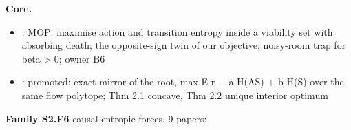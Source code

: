 \documentclass[10pt]{article}
\newcommand{\memb}[1]{\par\smallskip\textbf{#1}\quad}
\begin{document}
\memb{Core.}
\begin{itemize}[nosep,leftmargin=1.2em]
\item \citet{Ramirez-Ruiz-complex22}: MOP: maximise action and transition entropy inside a viability set with absorbing death; the opposite-sign twin of our objective; noisy-room trap for beta \textgreater{} 0; owner B6
\item \citet{Grytskyy-general23}: promoted: exact mirror of the root, max E r + a H(A\textbar{}S) + b H(S) over the same flow polytope; Thm 2.1 concave, Thm 2.2 unique interior optimum
\end{itemize}
\memb{Family S2.F6} causal entropic forces, 9 papers: {\footnotesize \citetext{\citealp{Kappen-comment13}; \citealp{Wissner-Gross-causal13}; \citealp{Mann-entropic15}; \citealp{Charlesworth-intrinsically19}; \citealp{Canessa-comment13}; \citealp{Devereux-environmental23}; \citealp{Andrecut-entropically25}; \citealp{Niizato-emergence26}; \citealp{Turley-causal26}}}
\end{document}
